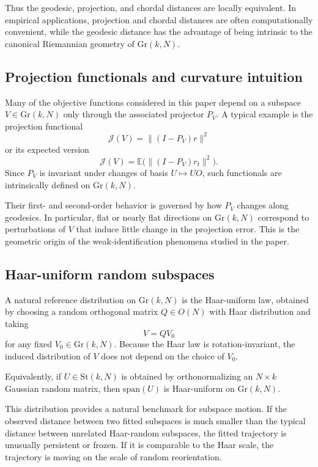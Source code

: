 \documentclass[11pt,letterpaper]{article}
\newcommand{\gr}{\mathrm{Gr}}
\newcommand{\cJ}{\mathcal{J}}
\begin{document}
Thus the geodesic, projection, and chordal distances are locally equivalent. In empirical applications, projection and chordal distances are often computationally convenient, while the geodesic distance has the advantage of being intrinsic to the canonical Riemannian geometry of $\gr(k,N)$.

\subsection{Projection functionals and curvature intuition}

Many of the objective functions considered in this paper depend on a subspace $V\in \gr(k,N)$ only through the associated projector $P_V$. A typical example is the projection functional
\begin{equation*}
\cJ(V)=\|(I-P_V)r\|^2
\end{equation*}
or its expected version
\begin{equation*}
\cJ(V)=\mathbb{E}\big(\|(I-P_V)r_t\|^2\big).
\end{equation*}
Since $P_V$ is invariant under changes of basis $U\mapsto UO$, such functionals are intrinsically defined on $\gr(k,N)$.

Their first- and second-order behavior is governed by how $P_V$ changes along geodesics. In particular, flat or nearly flat directions on $\gr(k,N)$ correspond to perturbations of $V$ that induce little change in the projection error. This is the geometric origin of the weak-identification phenomena studied in the paper.

\subsection{Haar-uniform random subspaces}

A natural reference distribution on $\gr(k,N)$ is the Haar-uniform law, obtained by choosing a random orthogonal matrix $Q\in O(N)$ with Haar distribution and taking
\begin{equation*}
V = QV_0
\end{equation*}
for any fixed $V_0\in \gr(k,N)$. Because the Haar law is rotation-invariant, the induced distribution of $V$ does not depend on the choice of $V_0$.

Equivalently, if $U\in \mathrm{St}(k,N)$ is obtained by orthonormalizing an $N\times k$ Gaussian random matrix, then $\mathrm{span}(U)$ is Haar-uniform on $\gr(k,N)$.

This distribution provides a natural benchmark for subspace motion. If the observed distance between two fitted subspaces is much smaller than the typical distance between unrelated Haar-random subspaces, the fitted trajectory is unusually persistent or frozen. If it is comparable to the Haar scale, the trajectory is moving on the scale of random reorientation.
\end{document}
